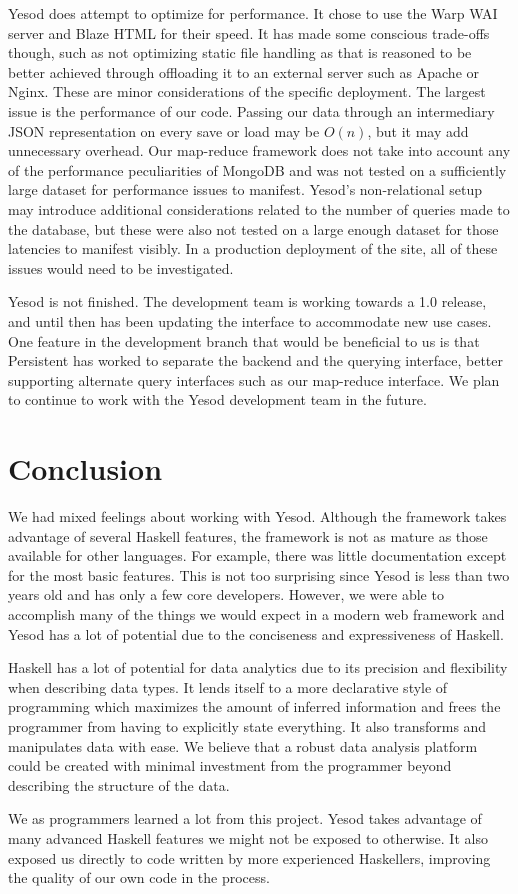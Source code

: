 \documentclass[letterpaper,twocolumn,9pt]{article}
\begin{document}
Yesod does attempt to optimize for performance.  It chose to use the Warp WAI server and Blaze HTML for their speed.  It has made some conscious trade-offs though, such as not optimizing static file handling as that is reasoned to be better achieved through offloading it to an external server such as Apache or Nginx.  These are minor considerations of the specific deployment.  The largest issue is the performance of our code.  Passing our data through an intermediary JSON representation on every save or load may be $O(n)$, but it may add unnecessary overhead.  Our map-reduce framework does not take into account any of the performance peculiarities of MongoDB and was not tested on a sufficiently large dataset for performance issues to manifest.  Yesod's non-relational setup may introduce additional considerations related to the number of queries made to the database, but these were also not tested on a large enough dataset for those latencies to manifest visibly.  In a production deployment of the site, all of these issues would need to be investigated.

Yesod is not finished.  The development team is working towards a 1.0 release, and until then has been updating the interface to accommodate new use cases.  One feature in the development branch that would be beneficial to us is that Persistent has worked to separate the backend and the querying interface, better supporting alternate query interfaces such as our map-reduce interface.  We plan to continue to work with the Yesod development team in the future.

\section{Conclusion}
\label{conclusion}

We had mixed feelings about working with Yesod. Although the framework takes advantage of several Haskell features, the framework is not as mature as those available for other languages. For example, there was little documentation except for the most basic features. This is not too surprising since Yesod is less than two years old and has only a few core developers.  However, we were able to accomplish many of the things we would expect in a modern web framework and Yesod has a lot of potential due to the conciseness and expressiveness of Haskell.

Haskell has a lot of potential for data analytics due to its precision and flexibility when describing data types.  It lends itself to a more declarative style of programming which maximizes the amount of inferred information and frees the programmer from having to explicitly state everything.  It also transforms and manipulates data with ease.  We believe that a robust data analysis platform could be created with minimal investment from the programmer beyond describing the structure of the data.

We as programmers learned a lot from this project. Yesod takes advantage of many advanced Haskell features we might not be exposed to otherwise.  It also exposed us directly to code written by more experienced Haskellers, improving the quality of our own code in the process.

{\footnotesize 
}
\end{document}
